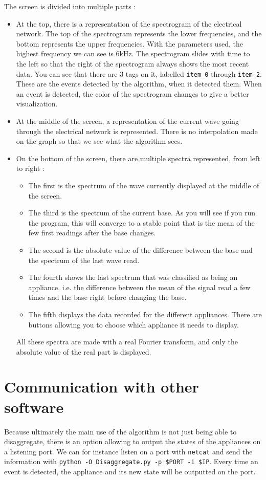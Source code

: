 The screen is divided into multiple parts :
\begin{itemize}
    \item At the top, there is a representation of the spectrogram of the electrical network. The top of the spectrogram represents the lower frequencies, and the bottom represents the upper frequencies. With the parameters used, the highest frequency we can see is 6kHz. The spectrogram slides with time to the left so that the right of the spectrogram always shows the most recent data. You can see that there are 3 tags on it, labelled \texttt{item\_0} through \texttt{item\_2}. These are the events detected by the algorithm, when it detected them. When an event is detected, the color of the spectrogram changes to give a better visualization.
    \item At the middle of the screen, a representation of the current wave going through the electrical network is represented. There is no interpolation made on the graph so that we see what the algorithm sees.
    \item On the bottom of the screen, there are multiple spectra represented, from left to right :
    \begin{itemize}
        \item The first is the spectrum of the wave currently displayed at the middle of the screen.
        \item The third is the spectrum of the current base. As you will see if you run the program, this will converge to a stable point that is the mean of the few first readings after the base changes.
        \item The second is the absolute value of the difference between the base and the spectrum of the last wave read.
        \item The fourth shows the last spectrum that was classified as being an appliance, i.e. the difference between the mean of the signal read a few times and the base right before changing the base.
        \item The fifth displays the data recorded for the different appliances. There are buttons allowing you to choose which appliance it needs to display.
    \end{itemize}
    All these spectra are made with a real Fourier transform, and only the absolute value of the real part is displayed.
\end{itemize}



\section{Communication with other software}
Because ultimately the main use of the algorithm is not just being able to disaggregate, there is an option allowing to output the states of the appliances on a listening port. We can for instance listen on a port with \texttt{netcat} and send the information with \texttt{python -O Disaggregate.py -p \$PORT -i \$IP}. Every time an event is detected, the appliance and its new state will be outputted on the port.

